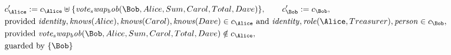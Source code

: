 \begin{align*}
&
c'_
{
\Alice
}
 := 
c_
{
\Alice
}
 \uplus 
\{
\mathit{
vote_swap_bob
}
(
\Bob
,
Alice
,
Sum
,
Carol
,
Total
,
Dave
)
\}
, \qquad 
c'_
{
\Bob
}
 := 
c_
{
\Bob
}
,\\
&
\text{provided } 
\mathit{
identity
}
,
\mathit{
knows
}
(
Alice
)
,
\mathit{
knows
}
(
Carol
)
,
\mathit{
knows
}
(
Dave
)
 \in c_
{
\Alice
}
 \text{ and } 
\mathit{
identity
}
,
\mathit{
role
}
(
\Alice
,
Treasurer
)
,
\mathit{
person
}
 \in c_
{
\Bob
}
,\\
&
\text{provided } 
\mathit{
vote_swap_bob
}
(
\Bob
,
Alice
,
Sum
,
Carol
,
Total
,
Dave
)
 \notin c_
{
\Alice
}
,\\
&
\text{guarded by } \{
\Bob
\}
\end{align*}

